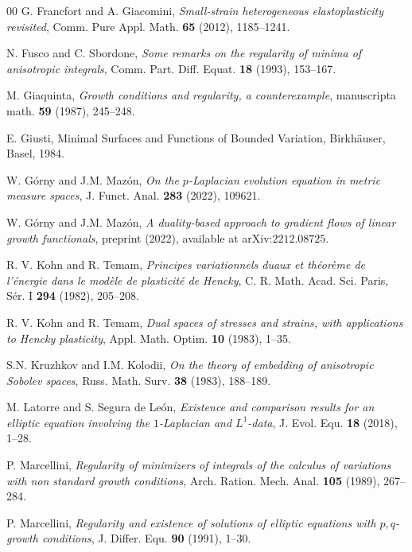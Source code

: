 \documentclass[reqno,12pt]{amsart}
\numberwithin{equation}{section}
\begin{document}
\begin{thebibliography}{00}
 G. Francfort and A. Giacomini, {\it Small-strain heterogeneous elastoplasticity revisited}, Comm. Pure Appl. Math. {\bf 65} (2012), 1185--1241.

 N. Fusco and C. Sbordone, {\it Some remarks on the regularity of minima of anisotropic integrals}, Comm. Part. Diff. Equat. {\bf 18} (1993), 153--167.

 M. Giaquinta, {\it Growth conditions and regularity, a counterexample}, manuscripta math. {\bf 59} (1987), 245--248. 

 E. Giusti, Minimal Surfaces and Functions of Bounded Variation, Birkh\"auser, Basel, 1984.

 W. G\'{o}rny and J.M. Maz\'{o}n, {\it On the $p$-Laplacian evolution equation in metric measure spaces}, J. Funct. Anal. {\bf 283} (2022), 109621.

 W. G\'{o}rny and J.M. Maz\'{o}n, {\it A duality-based approach to gradient flows of linear growth functionals}, preprint (2022), available at arXiv:$2212.08725$.

 R. V. Kohn and R. Temam, {\it Principes variationnels duaux et th\'{e}or\`{e}me de l’\'{e}nergie dans le mod\`{e}le de plasticit\'{e} de Hencky}, C. R. Math. Acad. Sci. Paris, S\'{e}r. I {\bf 294} (1982), 205--208.

 R. V. Kohn and R. Temam, {\it Dual spaces of stresses and strains, with applications to Hencky plasticity}, Appl. Math. Optim. {\bf 10} (1983), 1--35.

 S.N. Kruzhkov and I.M. Kolodii, {\it On the theory of embedding of anisotropic Sobolev spaces}, Russ. Math. Surv. {\bf 38} (1983), 188--189.

 M. Latorre and S. Segura de Le\'on, {\it Existence and comparison results for an elliptic equation involving the $1$-Laplacian and $L^1$-data}, J. Evol. Equ. {\bf 18} (2018), 1--28.  


 P. Marcellini, {\it Regularity of minimizers of integrals of the calculus of variations with non standard growth conditions}, Arch. Ration. Mech. Anal. {\bf 105} (1989), 267--284.

 P. Marcellini, {\it Regularity and existence of solutions of elliptic equations with $p,q$-growth conditions}, J. Differ. Equ. {\bf 90} (1991), 1--30.


\end{thebibliography}
\end{document}
